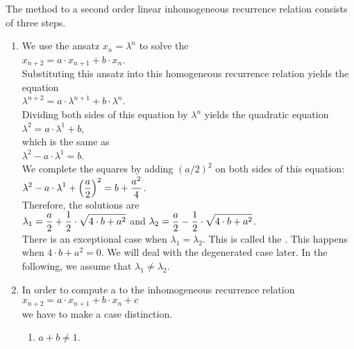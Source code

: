 \noindent
The method to  a second order linear inhomogeneous recurrence relation consists of three steps.
\begin{enumerate}
\item We use the ansatz $x_n = \lambda^n$ to solve the 
      \\[0.2cm]
      \hspace*{1.3cm}
      $x_{n+2} = a \cdot x_{n+1} + b \cdot x_n$.
      \\[0.2cm]
      Substituting this ansatz into this homogeneous recurrence relation yields the equation
      \\[0.2cm]
      \hspace*{1.3cm}
      $\lambda^{n+2} = a \cdot \lambda^{n+1} + b \cdot \lambda^n$.
      \\[0.2cm]
      Dividing both sides of this equation by $\lambda^n$ yields the quadratic equation
      \\[0.2cm]
      \hspace*{1.3cm}
      $\lambda^{2} = a \cdot \lambda^{1} + b$,
      \\[0.2cm]
      which is the same as
      \\[0.2cm]
      \hspace*{1.3cm}
      $\lambda^{2} - a \cdot \lambda^{1} = b$.
      \\[0.2cm]
      We complete the squares by adding $(a/2)^2$ on both sides of this equation:
      \\[0.2cm]
      \hspace*{1.3cm}
      $\displaystyle \lambda^{2} - a \cdot \lambda^{1} + \Bigl(\frac{a}{2}\Bigr)^2 = b + \frac{a^2}{4}$.
      \\[0.2cm]
      Therefore, the solutions are
      \\[0.2cm]
      \hspace*{1.3cm}
      $\displaystyle\lambda_1 = \frac{a}{2} + \frac{1}{2} \cdot \sqrt{4 \cdot b + a^2}$ \quad and \quad
      $\displaystyle\lambda_2 = \frac{a}{2} - \frac{1}{2} \cdot \sqrt{4 \cdot b + a^2}$.
      \\[0.2cm]
      There is an exceptional case when $\lambda_1 = \lambda_2$.  This is called the 
      .
      This happens when $4 \cdot b + a^2 = 0$.  We will deal with the degenerated case later.  In the
      following, we assume that $\lambda_1 \not= \lambda_2$.
\item In order to compute a   to the inhomogeneous recurrence relation
      \\[0.2cm]
      \hspace*{1.3cm}
      $x_{n+2} = a \cdot x_{n+1} + b \cdot x_n + c$
      \\[0.2cm]
      we have to make a case distinction.
      \begin{enumerate}
      \item $a + b \not= 1$.


\end{enumerate}
\end{enumerate}

